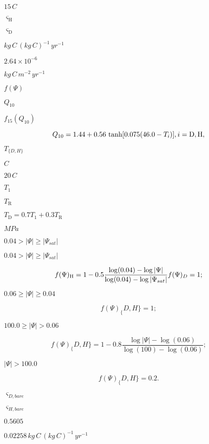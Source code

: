 \documentclass{article}
\begin{document}
{$15\,{C}$
\pagebreak

$\varsigma_\mathrm{H}$
\pagebreak

$\varsigma_\mathrm{D}$
\pagebreak

$kg\,C\,(kg\,C)^{-1}\,yr^{-1}$
\pagebreak

$2.64 \times 10^{-6}$
\pagebreak

$kg\,C\,m^{-2}\,yr^{-1}$
\pagebreak

$f(\Psi)$
\pagebreak

$Q_{10}$
\pagebreak

$f_{15}(Q_{10})$
\pagebreak

\[ Q_{10} = 1.44 + 0.56\,\tanh[0.075 (46.0 - T_i)], \nonumber\\ i = \mathrm{D}, \mathrm{H}\label{hyper}, \]
\pagebreak

$T_{\{D,H\}}$
\pagebreak

$C$
\pagebreak

$20\,C$
\pagebreak

$T_1$
\pagebreak

$T_\mathrm{R}$
\pagebreak

$T_\mathrm{D} = 0.7 T_1 + 0.3T_\mathrm{R}$
\pagebreak

$MPa$
\pagebreak

$0.04 > \vert \Psi \vert \geq \vert \Psi_{sat} \vert$
\pagebreak

$0.04 > \vert\Psi\vert \geq \vert\Psi_{sat}\vert$
\pagebreak

\[ f(\Psi)_\mathrm{H} = 1 - 0.5 \frac{\log(0.04)-\log\vert\Psi\vert} {\log(0.04)-\log\vert\Psi_{sat}\vert}\\ f(\Psi)_D = 1\nonumber; \]
\pagebreak

$0.06 \geq \vert\Psi\vert \geq 0.04$
\pagebreak

\[ f(\Psi)_\{D,H\} = 1; \]
\pagebreak

$100.0 \geq \vert\Psi\vert > 0.06$
\pagebreak

\[ f(\Psi)_\{D,H\} = 1 - 0.8\frac{\log\vert\Psi\vert-\log(0.06)}{\log(100)-\log(0.06)}; \]
\pagebreak

$\vert\Psi\vert > 100.0$
\pagebreak

\[ \label{lastpsi} f(\Psi)_\{D,H\}=0.2. \]
\pagebreak

$\varsigma_{D,bare}$
\pagebreak

$\varsigma_{H,bare}$
\pagebreak

$0.5605$
\pagebreak

$0.02258\,kg\,C\,(kg\,C)^{-1}\,yr^{-1}$
\pagebreak

}
\end{document}
